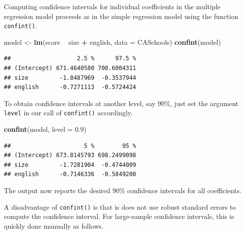 \documentclass[]{book}
\newenvironment{Shaded}{\begin{snugshade}}{\end{snugshade}}
\newcommand{\KeywordTok}[1]{\textcolor[rgb]{0.13,0.29,0.53}{\textbf{#1}}}
\newcommand{\DataTypeTok}[1]{\textcolor[rgb]{0.13,0.29,0.53}{#1}}
\newcommand{\FloatTok}[1]{\textcolor[rgb]{0.00,0.00,0.81}{#1}}
\newcommand{\StringTok}[1]{\textcolor[rgb]{0.31,0.60,0.02}{#1}}
\newcommand{\CommentTok}[1]{\textcolor[rgb]{0.56,0.35,0.01}{\textit{#1}}}
\newcommand{\OperatorTok}[1]{\textcolor[rgb]{0.81,0.36,0.00}{\textbf{#1}}}
\newcommand{\NormalTok}[1]{#1}
\theoremstyle{definition}
\theoremstyle{definition}
\theoremstyle{definition}
\theoremstyle{remark}
\begin{document}
Computing confidence intervals for individual coefficients in the
multiple regression model proceeds as in the simple regression model
using the function \texttt{confint()}.

\begin{Shaded}
\begin{Highlighting}[]
\NormalTok{model <-}\StringTok{ }\KeywordTok{lm}\NormalTok{(score }\OperatorTok{~}\StringTok{ }\NormalTok{size }\OperatorTok{+}\StringTok{ }\NormalTok{english, }\DataTypeTok{data =}\NormalTok{ CASchools)}
\KeywordTok{confint}\NormalTok{(model)}
\end{Highlighting}
\end{Shaded}

\begin{verbatim}
##                   2.5 %      97.5 %
## (Intercept) 671.4640580 700.6004311
## size         -1.8487969  -0.3537944
## english      -0.7271113  -0.5724424
\end{verbatim}

To obtain confidence intervals at another level, say \(90\%\), just set
the argument \texttt{level} in our call of \texttt{confint()}
accordingly.

\begin{Shaded}
\begin{Highlighting}[]
\KeywordTok{confint}\NormalTok{(model, }\DataTypeTok{level =} \FloatTok{0.9}\NormalTok{)}
\end{Highlighting}
\end{Shaded}

\begin{verbatim}
##                     5 %        95 %
## (Intercept) 673.8145793 698.2499098
## size         -1.7281904  -0.4744009
## english      -0.7146336  -0.5849200
\end{verbatim}

The output now reports the desired \(90\%\) confidence intervals for all
coefficients.

A disadvantage of \texttt{confint()} is that is does not use robust
standard errors to compute the confidence interval. For large-sample
confidence intervals, this is quickly done manually as follows.

\begin{Shaded}
\end{Shaded}
\end{document}
